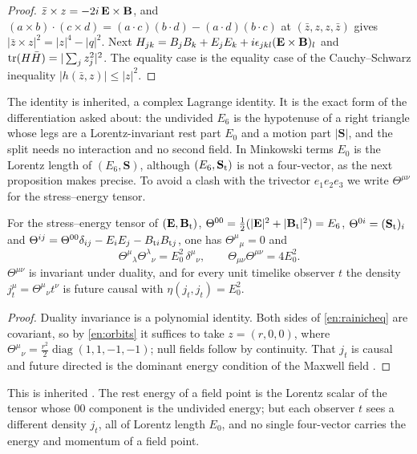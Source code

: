 \begin{proof}
$\bar z\times z=-2i\,\mathbf E\times\mathbf B$, and $(a\times b)\cdot(c\times d)=(a\cdot c)(b\cdot d)-(a\cdot d)(b\cdot c)$ at $(\bar z,z,z,\bar z)$ gives
$|\bar z\times z|^2=|z|^4-|q|^2$. Next $H_{jk}=B_jB_k+E_jE_k+i\epsilon_{jkl}(\mathbf E\times\mathbf B)_l$ and $\operatorname{tr}(H\bar H)=|\sum_jz_j^2|^2$. The equality case is the
equality case of the Cauchy--Schwarz inequality $|h(\bar z,z)|\le|z|^2$.
\end{proof}

The identity is inherited, a complex Lagrange identity. It is the exact form of the differentiation asked about: the undivided $E_6$ is the
hypotenuse of a right triangle whose legs are a Lorentz-invariant rest part $E_0$ and a motion part $|\mathbf S|$, and the split needs no
interaction and no second field. In Minkowski terms $E_0$ is the Lorentz length of $(E_6,\mathbf S)$, although $(E_6,\mathbf S_{\rm t})$ is not a
four-vector, as the next proposition makes precise. To avoid a clash with the trivector $e_1e_2e_3$ we write $\Theta^{\mu\nu}$ for the
stress--energy tensor.

\begin{proposition}
\label{en:rainich}
For the stress--energy tensor of $(\mathbf E,\mathbf B_{\rm t})$, $\Theta^{00}=\tfrac12(|\mathbf E|^2+|\mathbf B_{\rm t}|^2)=E_6$, $\Theta^{0i}=(\mathbf S_{\rm t})_i$ and
$\Theta^{ij}=\Theta^{00}\delta_{ij}-E_iE_j-B_{{\rm t}i}B_{{\rm t}j}$, one has $\Theta^\mu{}_\mu=0$ and
\begin{equation}
\label{en:rainicheq}
\Theta^\mu{}_\lambda\Theta^\lambda{}_\nu=E_0^2\,\delta^\mu{}_\nu ,\qquad \Theta_{\mu\nu}\Theta^{\mu\nu}=4E_0^2 .
\end{equation}
$\Theta^{\mu\nu}$ is invariant under duality, and for every unit timelike observer $t$ the density $j_t^\mu=\Theta^\mu{}_\nu t^\nu$ is future
causal with $\eta(j_t,j_t)=E_0^2$.
\end{proposition}

\begin{proof}
Duality invariance is a polynomial identity. Both sides of \eqref{en:rainicheq} are covariant, so by \cref{en:orbits} it suffices to take
$z=(r,0,0)$, where $\Theta^\mu{}_\nu=\tfrac{r^2}2\operatorname{diag}(1,1,-1,-1)$; null fields follow by continuity. That $j_t$ is causal and future
directed is the dominant energy condition of the Maxwell field \cite{HawkingEllis73}.
\end{proof}

This is inherited \cite{Rainich1925,Synge56}. The rest energy of a field point is the Lorentz scalar of the tensor whose $00$ component is the
undivided energy; but each observer $t$ sees a different density $j_t$, all of Lorentz length $E_0$, and no single four-vector carries the
energy and momentum of a field point.

